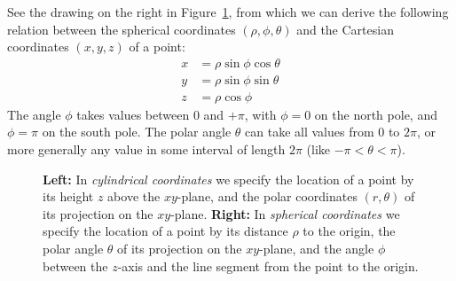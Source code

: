 See the drawing on the right in
%
Figure~\ref{fig:04cylindrical-spherical-coords}, from which we can
derive the following relation between the spherical coordinates
$(\rho, \phi, \theta)$ and the Cartesian coordinates $(x, y, z)$ of a
point:
\begin{equation}\label{eq:04spherical-to-cartesian}
  \begin{aligned}
    x &= \rho\sin\phi\cos \theta \\
    y &= \rho\sin\phi\sin \theta \\
    z &= \rho\cos\phi
  \end{aligned}
\end{equation}
The angle $\phi$ takes values between $0$ and $+\pi$, with $\phi=0$ on
the north pole, and $\phi=\pi$ on the south pole.  The polar angle
$\theta$ can take all values from $0$ to $2\pi$, or more generally any
value in some interval of length $2\pi$ (like $-\pi<\theta<\pi$).


\begin{figure}[t]\centering
  \hspace{0.1\textwidth}
  
  \hfill
  
  \hspace{0.1\textwidth}\null
  \caption{\textbf{Left: } In \emph{cylindrical coordinates} we specify the
  location of a point by its height $z$ above the $xy$-plane, and the
  polar coordinates $(r, \theta)$ of its projection on the $xy$-plane.
  \textbf{Right: } In \emph{spherical coordinates} we specify the location
  of a point by its distance $\rho$ to the origin, the polar angle
  $\theta$ of its projection on the $xy$-plane, and the 
  angle $\phi$ between the $z$-axis and the line segment from the
  point to the origin.}
  \label{fig:04cylindrical-spherical-coords}
\end{figure}


